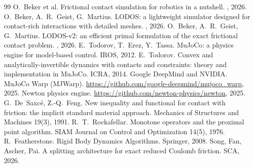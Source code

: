 \begin{thebibliography}{99}
 O.~Beker et al. Frictional contact simulation for robotics in a nutshell. , 2026.
 O.~Beker, A.~R.~Geist, G.~Martius. LODOS: a lightweight simulator designed for contact-rich interactions with detailed meshes. , 2026.
 O.~Beker, A.~R.~Geist, G.~Martius. LODOS-v2: an efficient primal formulation of the exact frictional contact problem. , 2026.
 E.~Todorov, T.~Erez, Y.~Tassa. MuJoCo: a physics engine for model-based control. IROS, 2012.
 E.~Todorov. Convex and analytically-invertible dynamics with contacts and constraints: theory and implementation in MuJoCo. ICRA, 2014.
 Google DeepMind and NVIDIA. MuJoCo Warp (MJWarp). \url{https://github.com/google-deepmind/mujoco_warp}, 2025.
 Newton physics engine. \url{https://github.com/newton-physics/newton}, 2025.
 G.~De~Saxc\'e, Z.-Q.~Feng. New inequality and functional for contact with friction: the implicit standard material approach. Mechanics of Structures and Machines 19(3), 1991.
 R.~T.~Rockafellar. Monotone operators and the proximal point algorithm. SIAM Journal on Control and Optimization 14(5), 1976.
 R.~Featherstone. Rigid Body Dynamics Algorithms. Springer, 2008.
 Song, Fan, Ascher, Pai. A splitting architecture for exact reduced Coulomb friction. SCA, 2026.
\end{thebibliography}


